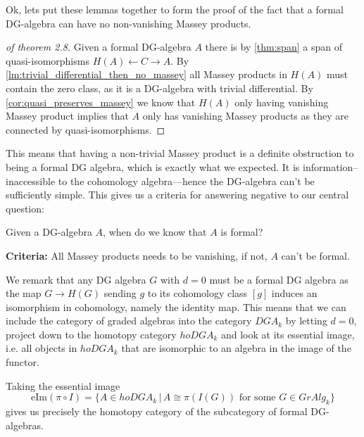 Ok, lets put these lemmas together to form the proof of the fact that a formal DG-algebra can have no non-vanishing Massey products. 

\begin{proof}[of theorem 2.8]
Given a formal DG-algebra $A$ there is by \ref{thm:span} a span of quasi-isomorphisms $H(A)\longleftarrow C\longrightarrow A$. By \cref{lm:trivial_differential_then_no_massey} all Massey products in $H(A)$ must contain the zero class, as it is a DG-algebra with trivial differential. By \cref{cor:quasi_preserves_massey} we know that $H(A)$ only having vanishing Massey product implies that $A$ only has vanishing Massey products as they are connected by quasi-isomorphisms. 
\end{proof}

This means that having a non-trivial Massey product is a definite obstruction to being a formal DG algebra, which is exactly what we expected. It is information--inaccessible to the cohomology algebra---hence the DG-algebra can't be sufficiently simple. This gives us a criteria for answering negative to our central question: 

\begin{central}
Given a DG-algebra $A$, when do we know that $A$ is formal?
\end{central}
\textbf{Criteria:} All Massey products needs to be vanishing, if not, $A$ can't be formal. 

We remark that any DG algebra $G$ with $d=0$ must be a formal DG algebra as the map $G\longrightarrow H(G)$ sending $g$ to its cohomology class $[g]$ induces an isomorphism in cohomology, namely the identity map. This means that we can include the category of graded algebras into the category $DGA_k$ by letting $d=0$, project down to the homotopy category $hoDGA_k$ and look at its essential image, i.e. all objects in $hoDGA_k$ that are isomorphic to an algebra in the image of the functor. 
\begin{center}
\end{center}
Taking the essential image
\begin{equation*}
    \text{eIm}(\pi\circ I) = \{A\in hoDGA_k \,\vert\, A\cong \pi( I(G)) \text{ for some } G\in GrAlg_k\}
\end{equation*}
gives us precisely the homotopy category of the subcategory of formal DG-algebras. 

